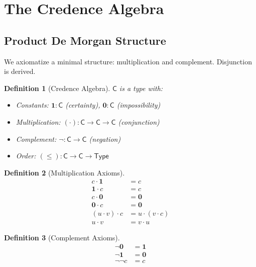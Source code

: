 \documentclass[11pt,a4paper]{article}
\newtheorem{definition}{Definition}[section]
\newcommand{\C}{\mathsf{C}}
\newcommand{\Type}{\mathsf{Type}}
\newcommand{\one}{\mathbf{1}}
\newcommand{\zero}{\mathbf{0}}
\newcommand{\negc}{\neg}
\begin{document}
\section{The Credence Algebra}

\subsection{Product De Morgan Structure}

We axiomatize a minimal structure: multiplication and complement. Disjunction is derived.

\begin{definition}[Credence Algebra]
$\C$ is a type with:
\begin{itemize}
    \item Constants: $\one : \C$ (certainty), $\zero : \C$ (impossibility)
    \item Multiplication: $(\cdot) : \C \to \C \to \C$ (conjunction)
    \item Complement: $\negc : \C \to \C$ (negation)
    \item Order: $(\leq) : \C \to \C \to \Type$
\end{itemize}
\end{definition}

\begin{definition}[Multiplication Axioms]
\begin{align}
c \cdot \one &= c \tag{unit-right} \\
\one \cdot c &= c \tag{unit-left} \\
c \cdot \zero &= \zero \tag{annihilate-right} \\
\zero \cdot c &= \zero \tag{annihilate-left} \\
(u \cdot v) \cdot c &= u \cdot (v \cdot c) \tag{assoc} \\
u \cdot v &= v \cdot u \tag{comm}
\end{align}
\end{definition}

\begin{definition}[Complement Axioms]
\begin{align}
\negc \zero &= \one \tag{neg-zero} \\
\negc \one &= \zero \tag{neg-one} \\
\negc \negc c &= c \tag{involution}
\end{align}
\end{definition}
\end{document}
